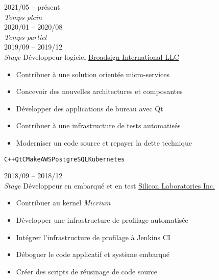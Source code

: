 \documentclass[9pt]{developercv} %
\begin{document}
\begin{minipage}[t]{0.8\textwidth}

\begin{entrylist}
	\entry
		{2021/05 -- présent\\{\small\emph{Temps plein}}\\2020/01 -- 2020/08\\{\small\emph{Temps partiel}}\\2019/09 -- 2019/12\\{\small\emph{Stage}}}
		{Développeur logiciel}
		{\href{https://broadsign.com/}{Broadsign International LLC}}
		{
			\vspace{-14pt}
			\begin{itemize}
				\renewcommand{\labelitemi}{\raisebox{.45ex}{\rule{.6ex}{.6ex}}}
				\setlength\itemsep{-1pt}
				\item Contribuer à une solution orientée micro-services
				\item Concevoir des nouvelles architectures et composantes
				\item Développer des applications de bureau avec Qt
				\item Contribuer à une infrastructure de tests automatisés
				\item Moderniser un code source et repayer la dette technique
			\end{itemize}
			\vspace{-4pt}
			\texttt{C++}\slashsep\texttt{Qt}\slashsep\texttt{CMake}\slashsep\texttt{AWS}\slashsep\texttt{PostgreSQL}\slashsep\texttt{Kubernetes}
		}
	\entry
		{2018/09 -- 2018/12\\{\small\emph{Stage}}}
		{Développeur en embarqué et en test}
		{\href{https://www.silabs.com/}{Silicon Laboratories Inc.}}
		{
			\vspace{-14pt}
			\begin{itemize}
				\renewcommand{\labelitemi}{\raisebox{.45ex}{\rule{.6ex}{.6ex}}}
				\setlength\itemsep{-1pt}
				\item Contribuer au kernel \emph{Micrium}
				\item Développer une infrastructure de profilage automatisée
				\item Intégrer l'infrastructure de profilage à Jenkins CI
				\item Déboguer le code applicatif et système embarqué
				\item Créer des scripts de réusinage de code source
			\end{itemize}
			\vspace{-4pt}
}
\end{entrylist}
\end{minipage}
\end{document}
